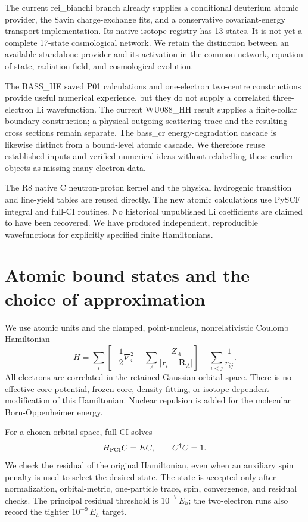 \documentclass[
  10pt,
]{article}
\begin{document}
The current rei\_bianchi branch already supplies a conditional deuterium
atomic provider, the Savin charge-exchange fits, and a conservative
covariant-energy transport implementation. Its native isotope registry
has 13 states. It is not yet a complete 17-state cosmological network.
We retain the distinction between an available standalone provider and
its activation in the common network, equation of state, radiation
field, and cosmological evolution.

The BASS\_HE saved P01 calculations and one-electron two-centre
constructions provide useful numerical experience, but they do not
supply a correlated three-electron Li wavefunction. The current
WU088\_HH result supplies a finite-collar boundary construction; a
physical outgoing scattering trace and the resulting cross sections
remain separate. The bass\_cr energy-degradation cascade is likewise
distinct from a bound-level atomic cascade. We therefore reuse
established inputs and verified numerical ideas without relabelling
these earlier objects as missing many-electron data.

The R8 native C neutron-proton kernel and the physical hydrogenic
transition and line-yield tables are reused directly. The new atomic
calculations use PySCF integral and full-CI routines. No historical
unpublished Li coefficients are claimed to have been recovered. We have
produced independent, reproducible wavefunctions for explicitly
specified finite Hamiltonians.

\hypertarget{atomic-bound-states-and-the-choice-of-approximation}{%
\section{Atomic bound states and the choice of
approximation}\label{atomic-bound-states-and-the-choice-of-approximation}}

We use atomic units and the clamped, point-nucleus, nonrelativistic
Coulomb Hamiltonian \[
H=\sum_i\left[-\frac12\nabla_i^2-\sum_A\frac{Z_A}{|\mathbf r_i-\mathbf R_A|}\right]
+\sum_{i<j}\frac{1}{r_{ij}}.
\] All electrons are correlated in the retained Gaussian orbital space.
There is no effective core potential, frozen core, density fitting, or
isotope-dependent modification of this Hamiltonian. Nuclear repulsion is
added for the molecular Born-Oppenheimer energy.

For a chosen orbital space, full CI solves \[
H_{\rm FCI}C=EC,\qquad C^\dagger C=1.
\] We check the residual of the original Hamiltonian, even when an
auxiliary spin penalty is used to select the desired state. The state is
accepted only after normalization, orbital-metric, one-particle trace,
spin, convergence, and residual checks. The principal residual threshold
is \(10^{-7}\,E_h\); the two-electron runs also record the tighter
\(10^{-9}\,E_h\) target.
\end{document}

